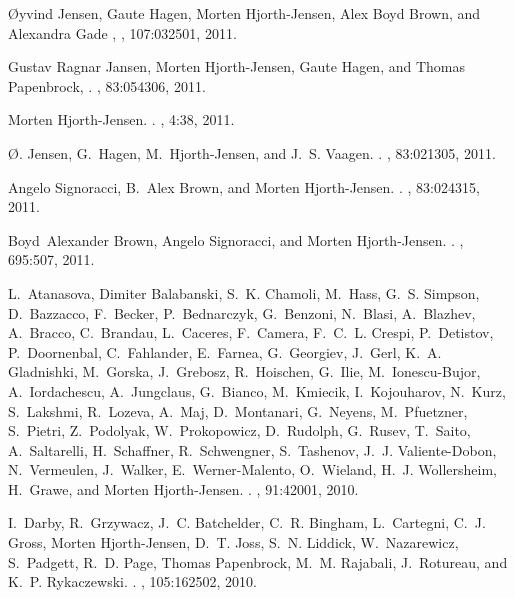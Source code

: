 \begin{thebibliography}{200}
\O yvind Jensen, Gaute Hagen, Morten Hjorth-Jensen, Alex Boyd Brown, and Alexandra Gade
, 
, 107:032501, 2011.


Gustav Ragnar Jansen, Morten Hjorth-Jensen, Gaute Hagen, and Thomas Papenbrock,
.
, 83:054306, 2011.

Morten Hjorth-Jensen.
.
, 4:38, 2011.


\O{}. Jensen, G.~Hagen, M.~Hjorth-Jensen, and J.~S. Vaagen.
.
, 83:021305, 2011.

Angelo Signoracci, B.~Alex Brown, and Morten Hjorth-Jensen.
.
, 83:024315, 2011.

Boyd~Alexander Brown, Angelo Signoracci, and Morten Hjorth-Jensen.
.
, 695:507, 2011.

L.~Atanasova, Dimiter Balabanski, S.~K. Chamoli, M.~Hass, G.~S. Simpson,
  D.~Bazzacco, F.~Becker, P.~Bednarczyk, G.~Benzoni, N.~Blasi, A.~Blazhev,
  A.~Bracco, C.~Brandau, L.~Caceres, F.~Camera, F.~C.~L. Crespi, P.~Detistov,
  P.~Doornenbal, C.~Fahlander, E.~Farnea, G.~Georgiev, J.~Gerl, K.~A.
  Gladnishki, M.~Gorska, J.~Grebosz, R.~Hoischen, G.~Ilie, M.~Ionescu-Bujor,
  A.~Iordachescu, A.~Jungclaus, G.~Bianco, M.~Kmiecik, I.~Kojouharov, N.~Kurz,
  S.~Lakshmi, R.~Lozeva, A.~Maj, D.~Montanari, G.~Neyens, M.~Pfuetzner,
  S.~Pietri, Z.~Podolyak, W.~Prokopowicz, D.~Rudolph, G.~Rusev, T.~Saito,
  A.~Saltarelli, H.~Schaffner, R.~Schwengner, S.~Tashenov, J.~J.
  Valiente-Dobon, N.~Vermeulen, J.~Walker, E.~Werner-Malento, O.~Wieland, H.~J.
  Wollersheim, H.~Grawe, and Morten Hjorth-Jensen.
.
, 91:42001, 2010.

I.~Darby, R.~Grzywacz, J.~C. Batchelder, C.~R. Bingham, L.~Cartegni, C.~J.
  Gross, Morten Hjorth-Jensen, D.~T. Joss, S.~N. Liddick, W.~Nazarewicz,
  S.~Padgett, R.~D. Page, Thomas Papenbrock, M.~M. Rajabali, J.~Rotureau, and
  K.~P. Rykaczewski.
.
, 105:162502, 2010.


\end{thebibliography}
